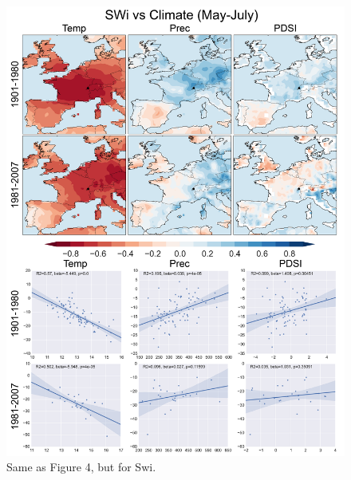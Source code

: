 \documentclass[12pt]{article}
\begin{document}
\begin{figure}
\center
\includegraphics[width=.9\columnwidth,scale=2]{SUPP_fig_11_SWi_MJJ_climate_onedeg_withtrend.png}
\caption{Same as Figure 4, but for Swi.}
\end{figure}
\end{document}
